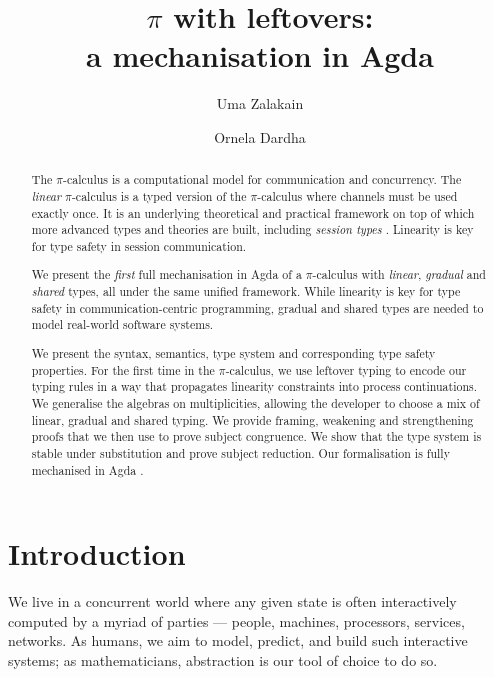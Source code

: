 \documentclass[a4paper,UKenglish,cleveref,autoref,thm-restate,authorcolumns]{lipics-v2019}
\title{$\pi$ with leftovers: \\ a mechanisation in Agda}
\author{Uma Zalakain}{University of Glasgow, Scotland}
       {u.zalakain.1@research.gla.ac.uk}{https://orcid.org/0000-0002-3268-9338}{}
\author{Ornela Dardha}{University of Glasgow, Scotland}
       {ornela.dardha@glasgow.ac.uk}{https://orcid.org/0000-0001-9927-7875}{}
\theoremstyle{definition}
\newcommand{\picalc}{$\pi$-calculus}
\begin{document}
\maketitle

\begin{abstract}
  The \picalc{} is a computational model for communication and concurrency.
  The \emph{linear} \picalc{} is a typed version of the \picalc{} where channels must be used exactly once.
  It is an underlying theoretical and practical framework on top of which more advanced types and theories are built, including \emph{session types} \cite{H93,THK94,HVK98}.
  Linearity is key for type safety in session communication.

  We present the \emph{first} full mechanisation in Agda of a \picalc{} with \emph{linear}, \emph{gradual} and \emph{shared} types, all under the same unified framework.
  While linearity is key for type safety in communication-centric programming, gradual and shared types are needed to model real-world software systems.
  
  We present the syntax, semantics, type system and corresponding type safety properties.
  For the first time in the \picalc{}, we use leftover typing \cite{Allais2018a} to encode our typing rules in a way that propagates linearity constraints into process continuations.
  We generalise the algebras on multiplicities, allowing the developer to choose a mix of linear, gradual and shared typing.
  We provide framing, weakening and strengthening proofs that we then use to prove subject congruence.
  We show that the type system is stable under substitution and prove subject reduction.
%
  Our formalisation is fully mechanised in Agda \cite{Zalakain2020Agda}.
\end{abstract}


\section{Introduction}
We live in a concurrent world where any given state is often interactively computed by a myriad of parties --- people, machines, processors, services, networks.
As humans, we aim to model, predict, and build such interactive systems; as mathematicians, abstraction is our tool of choice to do so.
\end{document}
